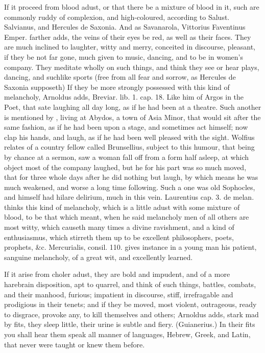 {If it proceed from blood adust, or that there be a mixture of blood in
it, such are commonly ruddy of complexion, and high-coloured,
according to Salust. Salvianus, and Hercules de Saxonia. And as
Savanarola, Vittorius Faventinus Emper. farther adds, the veins
of their eyes be red, as well as their faces. They are much inclined to
laughter, witty and merry, conceited in discourse, pleasant, if they be
not far gone, much given to music, dancing, and to be in women's
company. They meditate wholly on such things, and think they see
or hear plays, dancing, and suchlike sports (free from all fear and
sorrow, as Hercules de Saxonia supposeth) If they be more
strongly possessed with this kind of melancholy, Arnoldus adds,
Breviar. lib. 1. cap. 18. Like him of Argos in the Poet, that sate
laughing all day long, as if he had been at a theatre. Such
another is mentioned by \Aristotle{}, living at Abydos, a town of
Asia Minor, that would sit after the same fashion, as if he had been
upon a stage, and sometimes act himself; now clap his hands, and laugh,
as if he had been well pleased with the sight. Wolfius relates of a
country fellow called Brunsellius, subject to this humour, that
being by chance at a sermon, saw a woman fall off from a form half
asleep, at which object most of the company laughed, but he for his
part was so much moved, that for three whole days after he did nothing
but laugh, by which means he was much weakened, and worse a long time
following. Such a one was old Sophocles, and \Democritus{} himself had
hilare delirium, much in this vein. Laurentius cap. 3. de melan. thinks
this kind of melancholy, which is a little adust with some mixture of
blood, to be that which \Aristotle{} meant, when he said melancholy men of
all others are most witty, which causeth many times a divine
ravishment, and a kind of enthusiasmus, which stirreth them up to be
excellent philosophers, poets, prophets, \&c. Mercurialis, consil. 110.
gives instance in a young man his patient, sanguine melancholy,
of a great wit, and excellently learned.

If it arise from choler adust, they are bold and impudent, and of a
more harebrain disposition, apt to quarrel, and think of such things,
battles, combats, and their manhood, furious; impatient in discourse,
stiff, irrefragable and prodigious in their tenets; and if they be
moved, most violent, outrageous, ready to disgrace, provoke any,
to kill themselves and others; Arnoldus adds, stark mad by fits,
they sleep little, their urine is subtle and fiery. (Guianerius.)
In their fits you shall hear them speak all manner of languages,
Hebrew, Greek, and Latin, that never were taught or knew them before.

}
